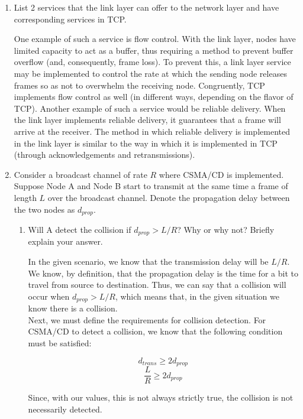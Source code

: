 \begin{enumerate}

    \item List 2 services that the link layer can offer to the network layer and have corresponding services in TCP.

      One example of such a service is flow control. With the link layer, nodes have limited capacity to act as a buffer, thus requiring a method to prevent buffer overflow (and, consequently, frame loss). To prevent this, a link layer service may be implemented to control the rate at which the sending node releases frames so as not to overwhelm the receiving node. Congruently, TCP implements flow control as well (in different ways, depending on the flavor of TCP). Another example of such a service would be reliable delivery. When the link layer implements reliable delivery, it guarantees that a frame will arrive at the receiver. The method in which reliable delivery is implemented in the link layer is similar to the way in which it is implemented in TCP (through acknowledgements and retransmissions).

    \item Consider a broadcast channel of rate $R$ where CSMA/CD is implemented. Suppose Node A and Node B start to transmit at the same time a frame of length $L$ over the broadcast channel. Denote the propagation delay between the two nodes as $d_{prop}$.

      \begin{enumerate}

        \item Will A detect the collision if $d_{prop}>L/R$? Why or why not? Briefly explain your answer.

          In the given scenario, we know that the transmission delay will be $L/R$. We know, by definition, that the propagation delay is the time for a bit to travel from source to destination. Thus, we can say that a collision will occur when $d_{prop}>L/R$, which means that, in the given situation we know there is a collision.\\

          Next, we must define the requirements for collision detection. For CSMA/CD to detect a collision, we know that the following condition must be satisfied:

          $$d_{trans}\geq 2d_{prop}$$
          $$\frac{L}{R}\geq 2d_{prop}$$

          Since, with our values, this is not always strictly true, the collision is not necessarily detected.


\end{enumerate}
\end{enumerate}
